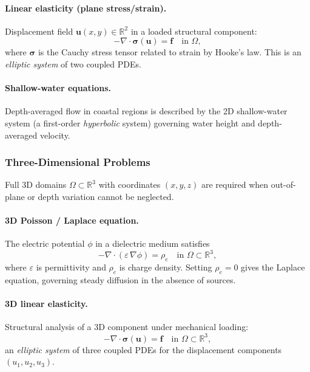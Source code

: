 \documentclass[11pt]{article}
\newcommand{\R}{\mathbb{R}}
\newcommand{\domain}{\Omega}
\begin{document}
\paragraph{Linear elasticity (plane stress/strain).}
Displacement field $\mathbf{u}(x,y) \in \R^2$ in a loaded structural
component:
\begin{equation*}
  -\nabla\cdot\boldsymbol{\sigma}(\mathbf{u}) = \mathbf{f}
  \quad \text{in } \domain,
\end{equation*}
where $\boldsymbol{\sigma}$ is the Cauchy stress tensor related to strain
by Hooke's law.
This is an \emph{elliptic system} of two coupled PDEs.

\paragraph{Shallow-water equations.}
Depth-averaged flow in coastal regions is described by the 2D
shallow-water system (a first-order \emph{hyperbolic} system) governing
water height and depth-averaged velocity.

\subsubsection{Three-Dimensional Problems}

Full 3D domains $\domain \subset \R^3$ with coordinates $(x,y,z)$ are
required when out-of-plane or depth variation cannot be neglected.

\paragraph{3D Poisson / Laplace equation.}
The electric potential $\phi$ in a dielectric medium satisfies
\begin{equation*}
  -\nabla\cdot(\varepsilon\,\nabla\phi) = \rho_e
  \quad \text{in } \domain \subset \R^3,
\end{equation*}
where $\varepsilon$ is permittivity and $\rho_e$ is charge density.
Setting $\rho_e = 0$ gives the Laplace equation, governing steady
diffusion in the absence of sources.

\paragraph{3D linear elasticity.}
Structural analysis of a 3D component under mechanical loading:
\begin{equation*}
  -\nabla\cdot\boldsymbol{\sigma}(\mathbf{u}) = \mathbf{f}
  \quad \text{in } \domain \subset \R^3,
\end{equation*}
an \emph{elliptic system} of three coupled PDEs for the displacement
components $(u_1, u_2, u_3)$.
\end{document}

